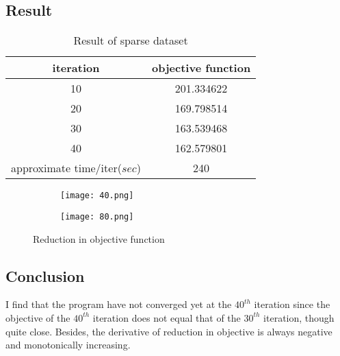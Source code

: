 \documentclass[a4paper,11pt]{article}
\begin{document}
\subsection{Result}
\begin{table}[H]
	\begin{center}
		\caption{Result of sparse dataset}
		\begin{tabular}{cc}
			\toprule[2pt] 
			iteration & objective function\\
			\hline
			10		  &	201.334622\\
			20		  &	169.798514\\
			30		  &	163.539468\\
			40		  &	162.579801\\
			\hline
			approximate time/iter($sec$)&240\\
			\bottomrule[2pt]
		\end{tabular} 
	\end{center}
\end{table}
\begin{figure}[H]
	\centering
	\begin{subfigure}[t]{0.45\textwidth}
		\centering
		\texttt{[image: 40.png]}
	\end{subfigure}
	\quad
	\begin{subfigure}[t]{0.45\textwidth}
		\centering
		\texttt{[image: 80.png]}
	\end{subfigure}	
	\caption{Reduction in objective function}
\end{figure}
\subsection{Conclusion}
I find that the program have not converged yet at the $40^{th}$ iteration since the objective of the $40^{th}$ iteration does not equal that of the $30^{th}$ iteration, though quite close. Besides, the derivative of reduction in objective is always negative and monotonically increasing.
\end{document}
